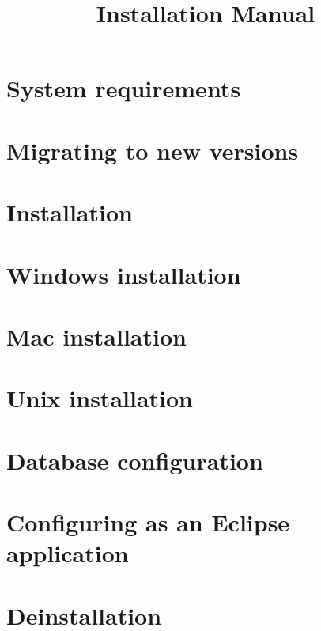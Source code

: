 
%
\title{Installation Manual}
\maketitle


\tableofcontents
\renewcommand{\bxcomment}[2]{}%
\clearpage
\setcounter{secnumdepth}{2}%

\chapter{System requirements}

\clearpage
\chapter{Migrating to new versions}

\clearpage
\chapter{Installation}

\clearpage
\chapter{Windows installation}

\clearpage
\chapter{Mac installation}

\clearpage
\chapter{Unix installation}
\label{Unix}

\clearpage
\chapter{Database configuration}


\chapter{Configuring as an Eclipse application}

\clearpage
\chapter{Deinstallation}

